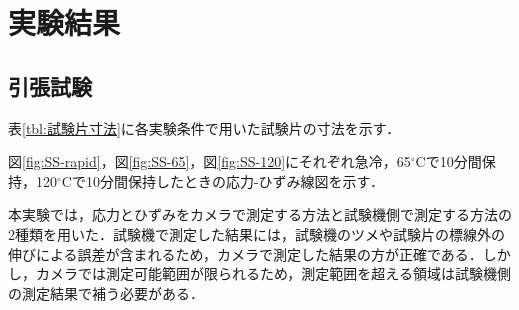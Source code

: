 \section{実験結果}

\subsection{引張試験}
表\ref{tbl:試験片寸法}に各実験条件で用いた試験片の寸法を示す．
\begin{table}[htbp]
  \centering
    \caption{Specimen width and thickness.}
    \label{tbl:試験片寸法}
\end{table}

図\ref{fig:SS-rapid}，図\ref{fig:SS-65}，図\ref{fig:SS-120}にそれぞれ急冷，65$^\circ$Cで10分間保持，120$^\circ$Cで10分間保持したときの応力-ひずみ線図を示す．

本実験では，応力とひずみをカメラで測定する方法と試験機側で測定する方法の2種類を用いた．試験機で測定した結果には，試験機のツメや試験片の標線外の伸びによる誤差が含まれるため，カメラで測定した結果の方が正確である．しかし，カメラでは測定可能範囲が限られるため，測定範囲を超える領域は試験機側の測定結果で補う必要がある．
\clearpage

